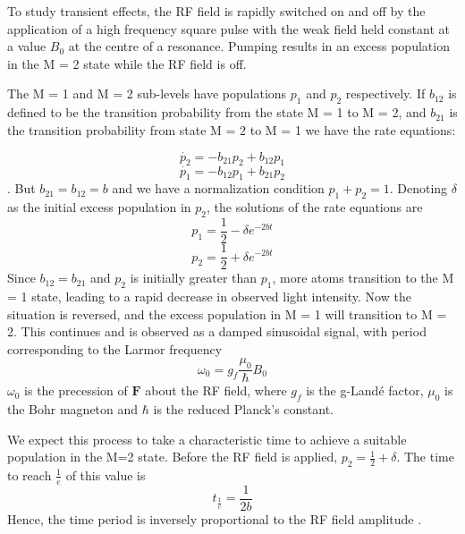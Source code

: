 \documentclass{article}
\begin{document}
\begin{multicols*}{2}
To study transient effects, the RF field is rapidly switched on and off by the application of a high frequency square pulse with the weak field held constant at a value $B_{0}$ at the centre of a resonance. Pumping results in an excess population in the M = 2 state while the RF field is off. 

The M = 1 and M = 2 sub-levels have populations $p_{1}$ and $p_{2}$ respectively. If $b_{12}$ is defined to be the transition probability from the state M = 1 to M = 2, and $b_{21}$ is the transition probability from state M = 2 to M = 1 we have the rate equations:

\begin{equation}\label{rate1}
    \dot{p_{2}} = -b_{21}p_{2} + b_{12}p_{1}
\end{equation}
\begin{equation}\label{rate2}
    \dot{p_{1}} = -b_{12}p_{1} + b_{21}p_{2}
\end{equation}
\cite{colegrove}. But $b_{21} = b_{12} = b$ and we have a normalization condition $p_{1} + p_{2} = 1$. Denoting $\delta$ as the initial excess population in $p_{2}$, the solutions of the rate equations are
\begin{equation}\label{sol1}
    p_{1} = \frac{1}{2}-\delta e^{-2bt}
\end{equation}
\begin{equation}\label{sol2}
    p_{2} = \frac{1}{2}+\delta e^{-2bt}
\end{equation}
Since $b_{12} = b_{21}$ and $p_{2}$ is initially greater than $p_{1}$, more atoms transition to the M = 1 state, leading to a rapid decrease in observed light intensity. Now the situation is reversed, and the excess population in M = 1 will transition to M = 2. This continues and is observed as a damped sinusoidal signal, with period corresponding to the Larmor frequency 
\begin{equation}\label{larmor}
  \omega_{0} = g_{f}\frac{\mu_{0}}{\hbar} B_{0}
\end{equation}
 $\omega_{0} $ is the precession of $\textbf{F}$  about the RF field, where $g_{f}$ is the g-Landé factor, $\mu_{0}$ is the Bohr magneton and $\hbar$ is the reduced Planck's constant.

 We expect this process to take a characteristic time to achieve a suitable population in the M=2 state. Before the RF field is applied, $p_{2} = \frac{1}{2}+\delta$. The time to reach $\frac{1}{e}$ of this value is
 \begin{equation}\label{char_time}
     t_{\frac{1}{e}} = \frac{1}{2b}
 \end{equation}
 Hence, the time period is inversely proportional to the RF field amplitude \cite{teachspin}.
 

\end{multicols*}
\end{document}
